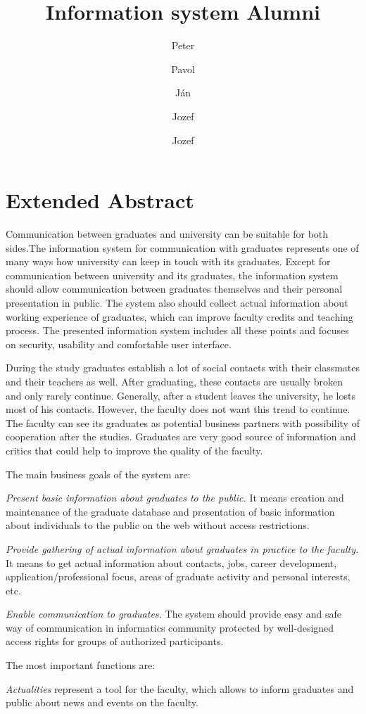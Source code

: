 \documentclass{iitsrc}
\title{Information system Alumni}
\author{Peter}{C\'ich}
\author{Pavol}{F\'abik}
\author{J\'an}{Garaj}
\author{Jozef}{Hergott}
\author{Jozef}{Hopko}
\begin{document}
\section*{Extended Abstract}

Communication between graduates and university can be suitable for both sides.The information system for communication with graduates represents one of many ways how university can keep in touch with its graduates. Except for communication between university and its graduates, the information system should allow communication between graduates themselves and their personal presentation in public. The system also should collect actual information about working experience of graduates, which can improve faculty credits and teaching process. The presented information system includes all these points and focuses on security, usability and comfortable user interface.

During the study graduates establish a lot of social contacts with their classmates and their teachers as well. After graduating, these contacts are usually broken and only rarely continue. Generally, after a student leaves the university, he losts most of his contacts. However, the faculty does not want this trend to continue. The faculty can see its graduates as potential business partners with possibility of cooperation after the studies. Graduates are very good source of information and critics that could help to improve the quality of the faculty.

The main business goals of the system are:

{\em Present basic information about graduates to the public.}
It means creation and maintenance of the graduate database and presentation of basic information about individuals to the public on the web without access restrictions.

{\em Provide gathering of actual information about graduates in practice to the faculty.} 
It means to get actual information about contacts, jobs, career development, application/professional focus, areas of graduate activity and personal interests, etc.

{\em Enable communication to graduates.}
The system should provide easy and safe way of communication in informatics community protected by well-designed access rights for groups of authorized participants.

The most important functions are:

{\em Actualities} 
represent a tool for the faculty, which allows to inform graduates and public about news and events on the faculty.
\end{document}
